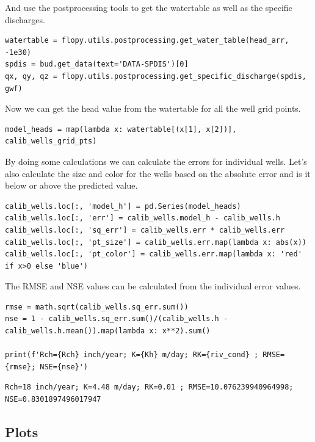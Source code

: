 \documentclass[titlepage,12pt]{unisubmission}
\begin{document}
And use the postprocessing tools to get the watertable as well as the specific discharges.

\begin{verbatim}
watertable = flopy.utils.postprocessing.get_water_table(head_arr, -1e30)
spdis = bud.get_data(text='DATA-SPDIS')[0]
qx, qy, qz = flopy.utils.postprocessing.get_specific_discharge(spdis, gwf)
\end{verbatim}

Now we can get the head value from the watertable for all the well grid points.

\begin{verbatim}
model_heads = map(lambda x: watertable[(x[1], x[2])], calib_wells_grid_pts)
\end{verbatim}

By doing some calculations we can calculate the errors for individual wells. Let's also calculate the size and color for the wells based on the absolute error and is it below or above the predicted value.

\begin{verbatim}
calib_wells.loc[:, 'model_h'] = pd.Series(model_heads)
calib_wells.loc[:, 'err'] = calib_wells.model_h - calib_wells.h
calib_wells.loc[:, 'sq_err'] = calib_wells.err * calib_wells.err
calib_wells.loc[:, 'pt_size'] = calib_wells.err.map(lambda x: abs(x))
calib_wells.loc[:, 'pt_color'] = calib_wells.err.map(lambda x: 'red' if x>0 else 'blue')
\end{verbatim}

The RMSE and NSE values can be calculated from the individual error values.

\begin{verbatim}
rmse = math.sqrt(calib_wells.sq_err.sum())
nse = 1 - calib_wells.sq_err.sum()/(calib_wells.h - calib_wells.h.mean()).map(lambda x: x**2).sum()

print(f'Rch={Rch} inch/year; K={Kh} m/day; RK={riv_cond} ; RMSE={rmse}; NSE={nse}')
\end{verbatim}

\begin{verbatim}
Rch=18 inch/year; K=4.48 m/day; RK=0.01 ; RMSE=10.076239940964998; NSE=0.8301897496017947
\end{verbatim}


\subsection{Plots}
\label{sec:org73eb5a2}
\end{document}

